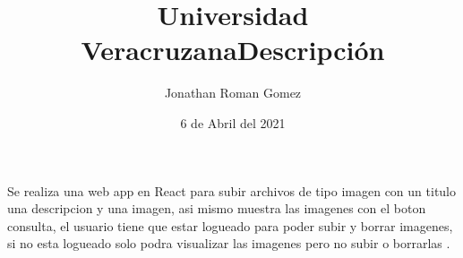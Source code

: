 \documentclass[10pt, letterpaper]{article}
\title{Universidad Veracruzana}
\author{Jonathan Roman Gomez}
\date{6 de Abril del 2021}
\begin{document}
\maketitle
\centering

\title{Descripción}

\begin{flushleft}Se realiza una web app en React para subir archivos de tipo imagen con un titulo una descripcion y una imagen, asi mismo muestra las imagenes con el boton consulta, el usuario tiene que estar logueado para poder subir y borrar imagenes, si no esta logueado solo podra visualizar las imagenes pero no subir o borrarlas . 
\end{flushleft}
\end{document}
